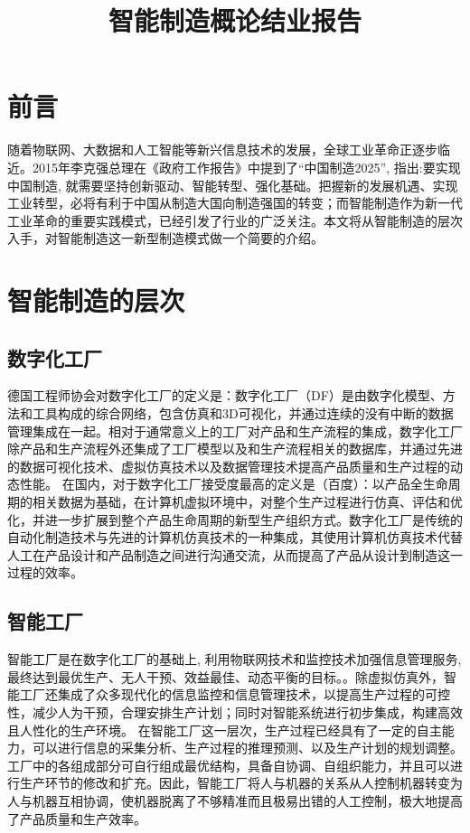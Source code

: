\documentclass{article}
\begin{document}
	
\title{智能制造概论结业报告}
  \section{前言}
  随着物联网、大数据和人工智能等新兴信息技术的发展，全球工业革命正逐步临近。2015年李克强总理在《政府工作报告》中提到了“中国制造2025”, 指出:要实现中国制造, 就需要坚持创新驱动、智能转型、强化基础。把握新的发展机遇、实现工业转型，必将有利于中国从制造大国向制造强国的转变；而智能制造作为新一代工业革命的重要实践模式，已经引发了行业的广泛关注。本文将从智能制造的层次入手，对智能制造这一新型制造模式做一个简要的介绍。
  \section{智能制造的层次}
  \subsection{数字化工厂}
  德国工程师协会对数字化工厂的定义是\cite{c2}：数字化工厂（DF）是由数字化模型、方法和工具构成的综合网络，包含仿真和3D可视化，并通过连续的没有中断的数据管理集成在一起。相对于通常意义上的工厂对产品和生产流程的集成，数字化工厂除产品和生产流程外还集成了工厂模型以及和生产流程相关的数据库，并通过先进的数据可视化技术、虚拟仿真技术以及数据管理技术提高产品质量和生产过程的动态性能。
在国内，对于数字化工厂接受度最高的定义是\cite{c3}（百度）：以产品全生命周期的相关数据为基础，在计算机虚拟环境中，对整个生产过程进行仿真、评估和优化，并进一步扩展到整个产品生命周期的新型生产组织方式。数字化工厂是传统的自动化制造技术与先进的计算机仿真技术的一种集成，其使用计算机仿真技术代替人工在产品设计和产品制造之间进行沟通交流，从而提高了产品从设计到制造这一过程的效率。
  \subsection{智能工厂}
  智能工厂是在数字化工厂的基础上, 利用物联网技术和监控技术加强信息管理服务, 最终达到最优生产、无人干预、效益最佳、动态平衡的目标。\cite{c4}。除虚拟仿真外，智能工厂还集成了众多现代化的信息监控和信息管理技术，以提高生产过程的可控性，减少人为干预，合理安排生产计划；同时对智能系统进行初步集成，构建高效且人性化的生产环境。
  在智能工厂这一层次，生产过程已经具有了一定的自主能力，可以进行信息的采集分析、生产过程的推理预测、以及生产计划的规划调整。工厂中的各组成部分可自行组成最优结构，具备自协调、自组织能力，并且可以进行生产环节的修改和扩充。因此，智能工厂将人与机器的关系从人控制机器转变为人与机器互相协调，使机器脱离了不够精准而且极易出错的人工控制，极大地提高了产品质量和生产效率。
\end{document}
